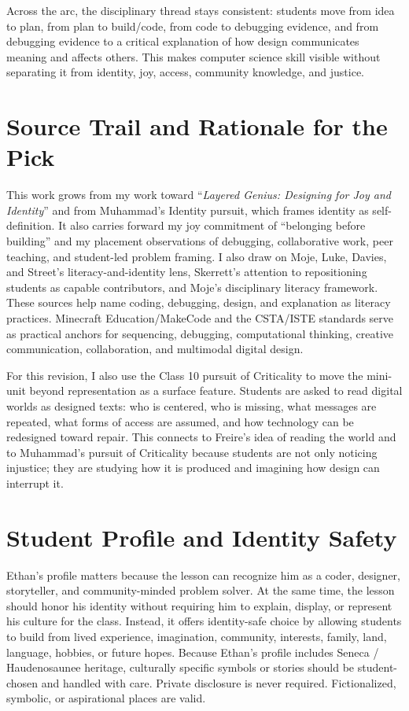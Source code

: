 \textcolor{LessonTwoAccent}{Across the arc, the disciplinary thread stays consistent: students move from idea to plan, from plan to build/code, from code to debugging evidence, and from debugging evidence to a critical explanation of how design communicates meaning and affects others. This makes computer science skill visible without separating it from identity, joy, access, community knowledge, and justice.}

\newpage
\section*{Source Trail and Rationale for the Pick}

This work grows from my work toward ``\emph{Layered Genius: Designing for Joy and Identity}'' and from Muhammad's Identity pursuit, which frames identity as self-definition. It also carries forward my joy commitment of ``belonging before building'' and my placement observations of debugging, collaborative work, peer teaching, and student-led problem framing. I also draw on Moje, Luke, Davies, and Street's literacy-and-identity lens, Skerrett's attention to repositioning students as capable contributors, and Moje's disciplinary literacy framework. These sources help name coding, debugging, design, and explanation as literacy practices. Minecraft Education/MakeCode and the CSTA/ISTE standards serve as practical anchors for sequencing, debugging, computational thinking, creative communication, collaboration, and multimodal digital design.

\textcolor{LessonTwoAccent}{For this revision, I also use the Class 10 pursuit of Criticality to move the mini-unit beyond representation as a surface feature. Students are asked to read digital worlds as designed texts: who is centered, who is missing, what messages are repeated, what forms of access are assumed, and how technology can be redesigned toward repair. This connects to Freire's idea of reading the world and to Muhammad's pursuit of Criticality because students are not only noticing injustice; they are studying how it is produced and imagining how design can interrupt it.}

\section*{Student Profile and Identity Safety}

Ethan's profile matters because the lesson can recognize him as a coder, designer, storyteller, and community-minded problem solver. At the same time, the lesson should honor his identity without requiring him to explain, display, or represent his culture for the class. Instead, it offers identity-safe choice by allowing students to build from lived experience, imagination, community, interests, family, land, language, hobbies, or future hopes. Because Ethan's profile includes Seneca / Haudenosaunee heritage, culturally specific symbols or stories should be student-chosen and handled with care. Private disclosure is never required. Fictionalized, symbolic, or aspirational places are valid.

